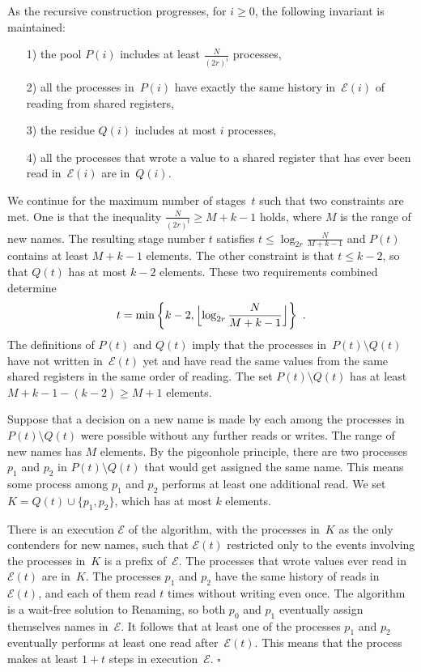 \documentclass[11pt]{article}
\newcommand{\cE}{\mathcal{E}}
\newcommand{\qed}{\hfill $\square$ \smallbreak}
\newenvironment{proof}{\noindent{\bf Proof:}}{\qed}
\begin{document}
\begin{proof}
As the recursive construction progresses, for $i\ge 0$, the following invariant is maintained:
\begin{enumerate}
\item[1)]
the pool $P(i)$ includes at least $\frac{N}{(2r)^i}$ processes, 
\item[2)]
all the processes in~$P(i)$ have exactly the same history in~$\cE(i)$ of reading from  shared registers,
\item[3)] 
the residue $Q(i)$ includes  at most $i$ processes,
\item[4)]
all the processes that wrote a value to a shared register that has ever been read in~$\cE(i)$  are in~$Q(i)$. 
\end{enumerate}

We continue for the maximum number of stages~$t$  such that two constraints are met.
One is that the inequality $\frac{N}{(2r)^{t}}\ge M+k-1$ holds, where $M$ is the range of new names.
The resulting stage number $t$ satisfies $t\le \log_{2r} \frac{N}{M+k-1}$ and $P(t)$ contains at least $M+k-1$ elements.
The other constraint is that $t\le k-2$, so that $Q(t)$ has at most $k-2$ elements. 
These two requirements combined determine 
\[
t=\min\left\{k-2,\Bigl\lfloor\log_{2r} \frac{N}{M+k-1}\Bigr\rfloor\right\}
\ .
\]
The definitions of $P(t)$ and $Q(t)$ imply that the processes in~$P(t) \setminus Q(t)$  have not written in~$\cE(t)$ yet  and have read the same values from the same shared registers in the same order of reading.
The set $P(t) \setminus Q(t)$ has at least $M+k-1-(k-2)\ge M+1$ elements.

Suppose that a decision on a new name is made by each among the processes in $P(t) \setminus Q(t)$ were possible without any further reads or writes.
The range of new names has $M$ elements.
By the pigeonhole principle, there are two processes $p_1$ and $p_2$ in $P(t) \setminus Q(t)$ that would get assigned  the same name.
This means some process among $p_1$ and $p_2$ performs at least one additional read.
We set $K=Q(t)\cup \{p_1,p_2\}$, which has at most $k$ elements.

There is an execution $\cE$ of the algorithm, with the processes in~$K$ as the only contenders for new names, such that $\cE(t)$ restricted only to the events involving the processes in~$K$ is a prefix of~$\cE$.
The processes that wrote values ever read in~$\cE(t)$ are in~$K$.
The processes $p_1$ and $p_2$ have the same history of reads  in~$\cE(t)$, and each of them read $t$ times without writing even once.
The algorithm is a wait-free solution to Renaming, so both $p_0$ and $p_1$ eventually assign themselves  names in~$\cE$.
It follows that at least one of the processes $p_1$ and $p_2$ eventually performs at least one read  after~$\cE(t)$.
This means that the process makes at least $1+t$ steps in execution~$\cE$.
\end{proof} 
\end{document}

